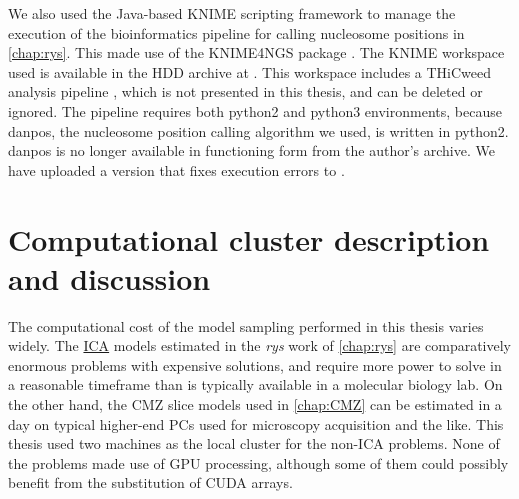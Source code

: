 We also used the Java-based KNIME scripting framework to manage the execution of the bioinformatics pipeline for calling nucleosome positions in \autoref{chap:rys}. This made use of the KNIME4NGS package \cite{Hastreiter2017}. The KNIME workspace used is available in the HDD archive at . This workspace includes a THiCweed analysis pipeline \cite{Agrawal2017}, which is not presented in this thesis, and can be deleted or ignored. The pipeline requires both python2 and python3 environments, because danpos, the nucleosome position calling algorithm we used, is written in python2. danpos \cite{Chen2013} is no longer available in functioning form from the author's archive. We have uploaded a version that fixes execution errors to .

\section{Computational cluster description and discussion}
\label{sec:cluster}
The computational cost of the model sampling performed in this thesis varies widely. The \hyperref[ssec:ICA]{ICA} models estimated in the \textit{rys} work of \autoref{chap:rys} are comparatively enormous problems with expensive solutions, and require more power to solve in a reasonable timeframe than is typically available in a molecular biology lab. On the other hand, the CMZ slice models used in \autoref{chap:CMZ} can be estimated in a day on typical higher-end PCs used for microscopy acquisition and the like. This thesis used two machines as the local cluster for the non-ICA problems. None of the problems made use of GPU processing, although some of them could possibly benefit from the substitution of CUDA arrays.

